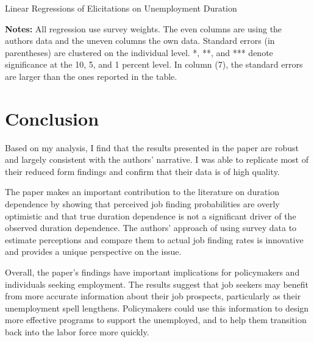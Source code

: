\documentclass[11pt,a4paper,leqno]{article}
\begin{document}
\begin{table}[!htbp] \centering 
\caption{Linear Regressions of Elicitations on Unemployment Duration}
\label{tab:realized_perc_table4}

\begin{minipage}[center]{.9\textwidth}
	\caption*{ \scriptsize \textbf{Notes:} All regression use survey weights. The even columns are using the authors data and the uneven columns the own data. Standard errors (in parentheses) are clustered on the individual level. *, **, and *** denote significance at the 10, 5, and 1 percent level. In column (7), the standard errors are larger than the ones reported in the table. }
\end{minipage}
\end{table}

\section{Conclusion}\label{sec:conclusion}

Based on my analysis, I find that the results presented in the paper are robust and largely consistent with the authors' narrative. I was able to replicate most of their reduced form findings and confirm that their data is of high quality.

The paper makes an important contribution to the literature on duration dependence by showing that perceived job finding probabilities are overly optimistic and that true duration dependence is not a significant driver of the observed duration dependence. The authors' approach of using survey data to estimate perceptions and compare them to actual job finding rates is innovative and provides a unique perspective on the issue.

Overall, the paper's findings have important implications for policymakers and individuals seeking employment. The results suggest that job seekers may benefit from more accurate information about their job prospects, particularly as their unemployment spell lengthens. Policymakers could use this information to design more effective programs to support the unemployed, and to help them transition back into the labor force more quickly.

\newpage

\printbibliography
\end{document}
